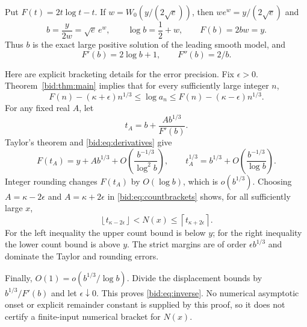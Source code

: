 \documentclass[11pt,letterpaper]{article}
\numberwithin{equation}{section}
\theoremstyle{remark}\newtheorem{remark}[theorem]{Remark}
\newcommand{\floor}[1]{\left\lfloor #1\right\rfloor}
\newcommand{\ceil}[1]{\left\lceil #1\right\rceil}
\begin{document}
Put $F(t)=2t\log t-t$. If
$w=W_0(y/(2\sqrt e))$, then $we^w=y/(2\sqrt e)$ and
\[
 b=\frac y{2w}=\sqrt e\,e^w,\qquad
 \log b=\frac12+w,\qquad F(b)=2bw=y.
\]
Thus $b$ is the exact large positive solution of the leading smooth
model, and
\begin{equation}\label{bid:eq:derivatives}
 F'(b)=2\log b+1,\qquad F''(b)=2/b.
\end{equation}

Here are explicit bracketing details for the error precision.
Fix $\epsilon>0$. Theorem~\ref{bid:thm:main} implies that for every
sufficiently large integer $n$,
\begin{equation}\label{bid:eq:countbrackets}
 F(n)-(\kappa+\epsilon)n^{1/3}
 \leq\log a_n\leq
 F(n)-(\kappa-\epsilon)n^{1/3}.
\end{equation}
For any fixed real $A$, let
\[
 t_A=b+\frac{A b^{1/3}}{F'(b)}.
\]
Taylor's theorem and \eqref{bid:eq:derivatives} give
\begin{equation}\label{bid:eq:taylorinverse}
 F(t_A)=y+A b^{1/3}
        +O\!\left(\frac{b^{-1/3}}{\log^2 b}\right),
 \qquad t_A^{1/3}=b^{1/3}
        +O\!\left(\frac{b^{-1/3}}{\log b}\right).
\end{equation}
Integer rounding changes $F(t_A)$ by $O(\log b)$, which is
$o(b^{1/3})$. Choosing $A=\kappa-2\epsilon$ and
$A=\kappa+2\epsilon$ in \eqref{bid:eq:countbrackets} shows, for all
sufficiently large $x$,
\begin{equation}\label{bid:eq:inversebrackets}
 \floor{t_{\kappa-2\epsilon}}<N(x)
 \leq\ceil{t_{\kappa+2\epsilon}}.
\end{equation}
For the left inequality the upper count bound is below $y$; for the
right inequality the lower count bound is above $y$. The strict
margins are of order $\epsilon b^{1/3}$ and dominate the Taylor and
rounding errors.

Finally, $O(1)=o(b^{1/3}/\log b)$. Divide the displacement bounds by
$b^{1/3}/F'(b)$ and let $\epsilon\downarrow0$. This proves
\eqref{bid:eq:inverse}. No numerical asymptotic onset or explicit
remainder constant is supplied by this proof, so it does not certify a
finite-input numerical bracket for $N(x)$.
\end{document}
